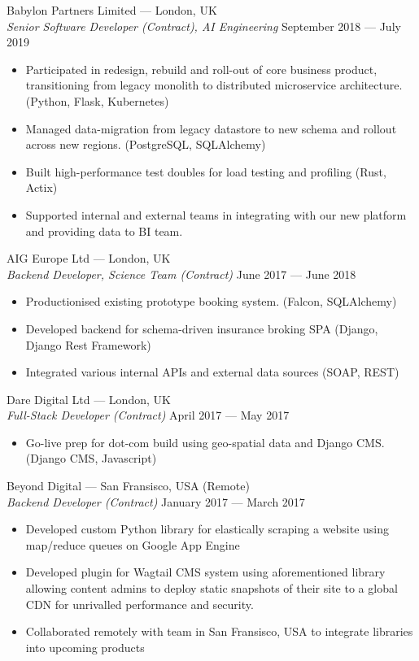 \documentclass[margin, 10pt]{res}
\begin{document}
\begin{resume}
Babylon Partners Limited --- London, UK \\
{\sl Senior Software Developer (Contract), AI Engineering}  \hfill September 2018 --- July 2019 \\
\begin{itemize} \itemsep -1pt
\item Participated in redesign, rebuild and roll-out of core business product, transitioning from legacy monolith to distributed microservice architecture. (Python, Flask, Kubernetes)
\item Managed data-migration from legacy datastore to new schema and rollout across new regions. (PostgreSQL, SQLAlchemy)
\item Built high-performance test doubles for load testing and profiling (Rust, Actix)
\item Supported internal and external teams in integrating with our new platform and providing data to BI team.
\end{itemize}


AIG Europe Ltd --- London, UK \\
{\sl Backend Developer, Science Team (Contract)} \hfill June 2017 --- June 2018 \\
\begin{itemize} \itemsep -1pt
\item Productionised existing prototype booking system. (Falcon, SQLAlchemy)
\item Developed backend for schema-driven insurance broking SPA (Django, Django Rest Framework)
\item Integrated various internal APIs and external data sources (SOAP, REST)
\end{itemize}

Dare Digital Ltd --- London, UK \\
{\sl Full-Stack Developer (Contract)} \hfill April 2017 --- May 2017 \\
\begin{itemize} \itemsep -1pt
\item Go-live prep for dot-com build using geo-spatial data and Django CMS. (Django CMS, Javascript)
\end{itemize}

Beyond Digital --- San Fransisco, USA (Remote) \\
{\sl Backend Developer (Contract)} \hfill January 2017 --- March 2017 \\

\begin{itemize} \itemsep -1pt
\item Developed custom Python library for elastically scraping a website using map/reduce queues on Google App Engine
\item Developed plugin for Wagtail CMS system using aforementioned library allowing content admins to deploy static snapshots of their site to a global CDN for unrivalled performance and security.
\item Collaborated remotely with team in San Fransisco, USA to integrate libraries into upcoming products
\end{itemize}


\end{resume}
\end{document}
